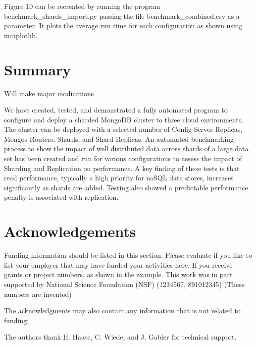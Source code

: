 \documentclass[9pt,twocolumn,twoside]{../../styles/osajnl}
\begin{document}
Figure 10 can be recreated by running the program benchmark\_shards\_import.py passing the file benchmark\_combined.csv as a parameter.  It plots the average run time for each configuration as shown using matplotlib.



\section{Summary}

Will make major modications

We have created, tested, and demonstrated a fully automated program to configure and deploy a sharded MongoDB cluster to three cloud environments.  The cluster can be deployed with a selected number of Config Server Replicas, Mongos Routers, Shards, and Shard Replicas.  An automated benchmarking process to show the impact of well distributed data across shards of a large data set has been created and run for various configurations to assess the impact of Sharding and Replication on performance.  A key finding of these tests is that read performance, typically a high priority for noSQL data stores, increases significantly as shards are added.  Testing also showed a predictable performance penalty is associated with replication.




\section*{Acknowledgements}

Funding information should be listed in this section. Please evaluate
if you like to list your employer that may have funded your activities
here.  If you receive grants or project numbers, as shown in the
example.  This work was in part supported by National Science
Foundation (NSF) (1234567, 891012345) (These numbers are invented)

The acknowledgments may also contain any information that is not
related to funding:

The authors thank H. Haase, C. Wiede, and J. Gabler for technical
support.




 
\end{document}
